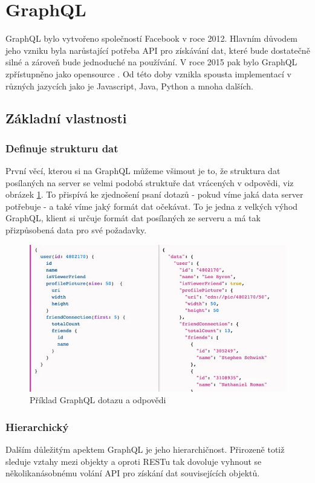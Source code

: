 \documentclass[thesis=M,czech]{FITthesis}[2019/12/23]
\begin{document}
\section{GraphQL}
GraphQL bylo vytvořeno společností Facebook v roce 2012. Hlavním důvodem jeho vzniku byla narůstající potřeba API pro získávání dat, které bude dostatečně silné a zároveň bude jednoduché na používání. V roce 2015 pak bylo GraphQL zpřístupněno jako opensource \cite{graphql_fb}. Od této doby vznikla spousta implementací v různých jazycích jako je Javascript, Java, Python a mnoha dalších.

\subsection{Základní vlastnosti}
\subsubsection*{Definuje strukturu dat}
První věcí, kterou si na GraphQL můžeme všimout je to, že struktura dat posílaných na server se velmi podobá struktuře dat vrácených v odpovědi, viz obrázek \ref{graphql-query}. To přispívá ke zjednošení psaní dotazů - pokud víme jaká data server potřebuje - a také víme jaký formát dat očekávat. To je jedna z velkých výhod GraphQL, klient si určuje formát dat posílaných ze serveru a má tak přizpůsobená data pro své požadavky.

\begin{figure}[h]
    \includegraphics[width=\linewidth]{img/graphql-query.png}
    \caption{Příklad GraphQL dotazu a odpovědi \cite{graphql_query_img}}
	\label{graphql-query}
\end{figure}

\subsubsection*{Hierarchický}
Dalším důležitým apektem GraphQL je jeho hierarchičnost. Přirozeně totiž sleduje vztahy mezi objekty a oproti RESTu tak dovoluje vyhnout se několikanásobnému volání API pro získání dat souvisejících objektů.
\end{document}
